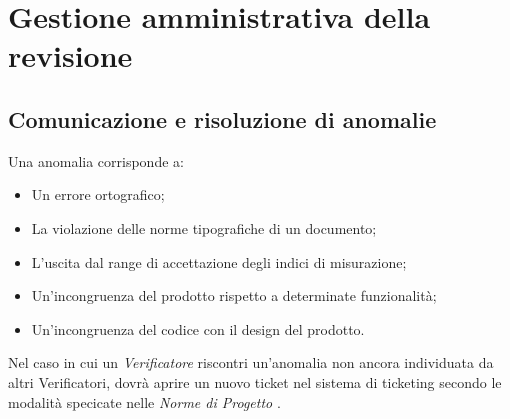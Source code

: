 \section{Gestione amministrativa della revisione}
\subsection{Comunicazione e risoluzione di anomalie}
  Una anomalia corrisponde a:
  \begin{itemize}
    \item Un errore ortografico;
    \item La violazione delle norme tipografiche di un documento;
    \item L'uscita dal range di accettazione degli indici di misurazione;
    \item Un'incongruenza del prodotto rispetto a determinate funzionalità;
    \item Un'incongruenza del codice con il design del prodotto.
  \end{itemize}
  Nel caso in cui un \emph{Verificatore} riscontri un'anomalia non ancora individuata da
  altri Verificatori, dovrà aprire un nuovo ticket nel sistema di ticketing secondo
  le modalità specicate nelle \emph{Norme di Progetto \VersioneNP{}}.
